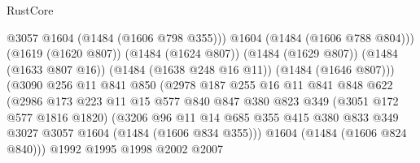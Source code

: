 \begin{lexlean}{RustCore}
\begin{coremodule}
                                      @3057
                                      @1604
                                      (@1484 (@1606 @798 @355)))
                                    @1604
                                    (@1484 (@1606 @788 @804)))
                                  (@1619 (@1620 @807))
                                  (@1484 (@1624 @807))
                                  (@1484 (@1629 @807))
                                  (@1484 (@1633 @807 @16))
                                  (@1484 (@1638 @248 @16 @11))
                                  (@1484 (@1646 @807)))
                                (@3090
                                  @256
                                  @11
                                  @841
                                  @850
                                  (@2978
                                    @187
                                    @255
                                    @16
                                    @11
                                    @841
                                    @848
                                    @622
                                    (@2986
                                      @173
                                      @223
                                      @11
                                      @15
                                      @577
                                      @840
                                      @847
                                      @380
                                      @823
                                      @349
                                      (@3051 @172 @577 @1816 @1820)
                                      (@3206
                                        @96
                                        @11
                                        @14
                                        @685
                                        @355
                                        @415
                                        @380
                                        @833
                                        @349
                                        @3027
                                        @3057
                                        @1604
                                        (@1484 (@1606 @834 @355)))
                                      @1604
                                      (@1484 (@1606 @824 @840)))
                                    @1992
                                    @1995
                                    @1998
                                    @2002
                                    @2007

\end{coremodule}
\end{lexlean}
